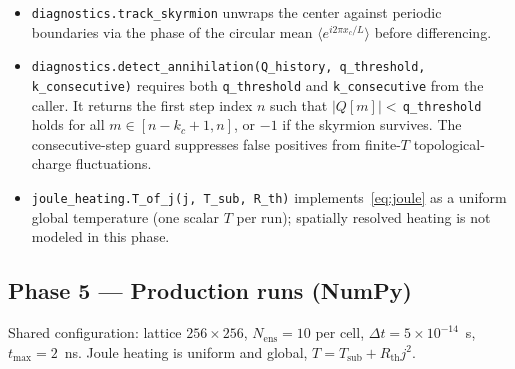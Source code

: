\documentclass[11pt,a4paper]{article}
\newcommand{\jcur}{j}
\begin{document}
\begin{itemize}[leftmargin=2em]
    \item \texttt{diagnostics.track\_skyrmion} unwraps the center
    against periodic boundaries via the phase of the circular mean
    $\langle e^{i 2\pi x_c / L}\rangle$ before differencing.
    \item \texttt{diagnostics.detect\_annihilation(Q\_history,
    q\_threshold, k\_consecutive)} requires both
    \texttt{q\_threshold} and \texttt{k\_consecutive} from the
    caller. It returns the first step index $n$ such that
    $|Q[m]| < $\,\texttt{q\_threshold} holds for all $m \in
    [n - k_c + 1, n]$, or $-1$ if the skyrmion survives. The
    consecutive-step guard suppresses false positives from
    finite-$T$ topological-charge fluctuations.
    \item \texttt{joule\_heating.T\_of\_j(j, T\_sub, R\_th)}
    implements~\eqref{eq:joule} as a uniform global temperature
    (one scalar $T$ per run); spatially resolved heating is not
    modeled in this phase.
\end{itemize}

\subsection{Phase 5 --- Production runs (NumPy)}

Shared configuration: lattice $256 \times 256$,
$N_{\text{ens}} = 10$ per cell, $\Delta t = 5\times 10^{-14}$~s,
$t_{\max} = 2$~ns. Joule heating is uniform and global,
$T = T_{\text{sub}} + R_{\text{th}} \jcur^2$.
\end{document}
